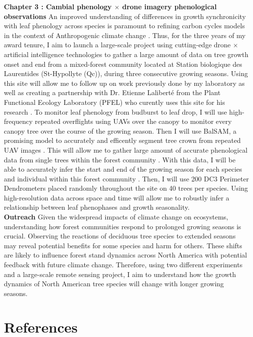 \documentclass[12pt]{article}
\begin{document}
\textbf{Chapter 3 : Cambial phenology $\times$ drone imagery phenological observations}
An improved understanding of differences in growth synchronicity with leaf phenology across species is paramount to refining carbon cycles models in the context of Anthropogenic climate change \citep{klein_coordination_2016,kramer_importance_2000,richardson_climate_2013,swidrak_comparing_2013}. Thus, for the three years of my award tenure, I aim to launch a large-scale project using cutting-edge drone $\times$  artificial intelligence technologies \citep{ball_accurate_2023,teng_bringing_2025,ulku_deep_2022} to gather a large amount of data on tree growth onset and end from a mixed-forest community located at Station biologique des Laurentides (St-Hypollyte (Qc)), during three consecutive growing seasons. Using this site will allow me to follow up on work previously done by my laboratory \citep{flynn_temperature_2018} as well as creating a partnership with Dr. Etienne Laliberté from the Plant Functional Ecology Laboratory (PFEL) who curently uses this site for his research \citep{cloutier_influence_2024}. To monitor leaf phenology from budburst to leaf drop, I will use high-frequency repeated overflights using UAVs over the canopy to monitor every canopy tree over the course of the growing season. Then I will use BalSAM, a promising model to accurately and efficently segment tree crown from repeated UAV images \citep{teng_bringing_2025}. This will allow me to gather large amount of accurate phenological data from single trees within the forest community \citep{teng_bringing_2025}. With this data, I will be able to accurately infer the start and end of the growing season for each species and individual within this forest community \citep{berra_assessing_2019,fawcett_monitoring_2021}. Then, I will use 200 DC3 Perimeter Dendrometers placed randomly throughout the site on 40 trees per species. Using high-resolution data across space and time will allow me to robustly infer a relationship between leaf phenophases and growth seasonality.\\


\textbf{Outreach}
Given the widespread impacts of climate change on ecosystems, understanding how forest communities respond to prolonged growing seasons is crucial. Observing the reactions of deciduous tree species to extended seasons may reveal potential benefits for some species and harm for others. These shifts are likely to influence forest stand dynamics across North America with potential feedback with future climate change. Therefore, using two different experiments and a large-scale remote sensing project, I aim to understand how the growth dynamics of North American tree species will change with longer growing seasons.  

\section*{References}

\end{document}
